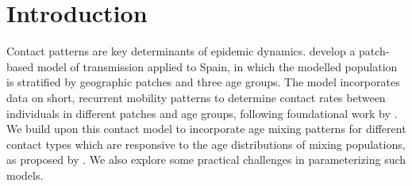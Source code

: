 \section{Introduction}\label{intro}
Contact patterns are key determinants of epidemic dynamics.
\citet{Arenas2020} develop a patch-based model of \covid transmission applied to Spain,
in which the modelled population is stratified by geographic patches and three age groups.
The model incorporates data on short, recurrent mobility patterns
to determine contact rates between individuals in different patches and age groups,
following foundational work by \citet{Balcan2011,Sattenspiel1995}.
We build upon this contact model to incorporate age mixing patterns
for different contact types which are responsive to
the age distributions of mixing populations, as proposed by \citet{Arregui2018}.
We also explore some practical challenges in parameterizing such models.